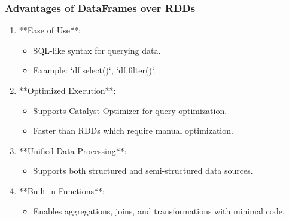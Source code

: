 \documentclass[aspectratio=169]{beamer}
\begin{document}
\begin{frame}
    \frametitle{Advantages of DataFrames over RDDs}
    \begin{enumerate}
        \item **Ease of Use**:
            \begin{itemize}
                \item SQL-like syntax for querying data.
                \item Example: `df.select()`, `df.filter()`.
            \end{itemize}
        \item **Optimized Execution**:
            \begin{itemize}
                \item Supports Catalyst Optimizer for query optimization.
                \item Faster than RDDs which require manual optimization.
            \end{itemize}
        \item **Unified Data Processing**:
            \begin{itemize}
                \item Supports both structured and semi-structured data sources.
            \end{itemize}
        \item **Built-in Functions**:
            \begin{itemize}
                \item Enables aggregations, joins, and transformations with minimal code.
            \end{itemize}
    \end{enumerate}
\end{frame}
\end{document}
